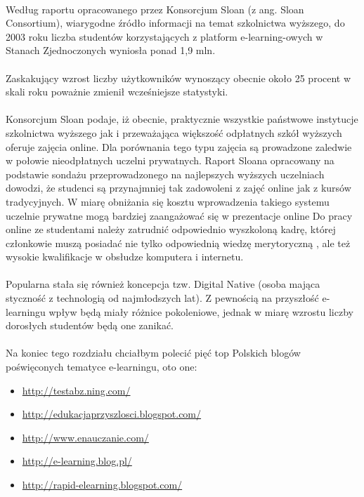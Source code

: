 \ \\
Według raportu opracowanego przez Konsorcjum Sloan (z ang. Sloan Consortium), wiarygodne źródło informacji na temat szkolnictwa wyższego, do 2003 roku liczba studentów korzystających z platform e-learning-owych w Stanach Zjednoczonych wyniosła ponad 1,9 mln. \\
\ \\
Zaskakujący wzrost liczby użytkowników wynoszący obecnie około 25 procent w skali roku poważnie zmienił wcześniejsze statystyki. \\
\ \\
Konsorcjum Sloan podaje, iż obecnie, praktycznie wszystkie państwowe instytucje szkolnictwa wyższego jak i przeważająca większość odpłatnych szkół wyższych oferuje zajęcia online. Dla porównania tego typu zajęcia są prowadzone zaledwie w połowie nieodpłatnych uczelni prywatnych. Raport Sloana opracowany na podstawie sondażu przeprowadzonego na najlepszych wyższych uczelniach dowodzi, że studenci są przynajmniej tak zadowoleni z zajęć online jak z kursów tradycyjnych. W miarę obniżania się kosztu wprowadzenia takiego systemu uczelnie prywatne mogą bardziej zaangażować się w prezentacje online Do pracy online ze studentami należy zatrudnić odpowiednio wyszkoloną kadrę, której członkowie muszą posiadać nie tylko odpowiednią wiedzę merytoryczną , ale też wysokie kwalifikacje w obsłudze komputera i internetu. \\
\ \\
Popularna stała się również koncepcja tzw. Digital Native (osoba mająca styczność z technologią od najmłodszych lat). Z pewnością na przyszłość e-learningu wpływ będą miały różnice pokoleniowe, jednak w miarę wzrostu liczby dorosłych studentów będą one zanikać. \cite{wiki_e-l} \\
\ \\
Na koniec tego rozdziału chciałbym polecić pięć top Polskich blogów poświęconych tematyce e-learningu, oto one:
	\begin{itemize}
		\item \href{http://testabz.ning.com/}{http://testabz.ning.com/}
		\item \href{http://edukacjaprzyszlosci.blogspot.com/}{http://edukacjaprzyszlosci.blogspot.com/}
		\item \href{http://www.enauczanie.com/ }{http://www.enauczanie.com/ }
		\item \href{http://e-learning.blog.pl/}{http://e-learning.blog.pl/}
		\item \href{http://rapid-elearning.blogspot.com/}{http://rapid-elearning.blogspot.com/}
	\end{itemize}
